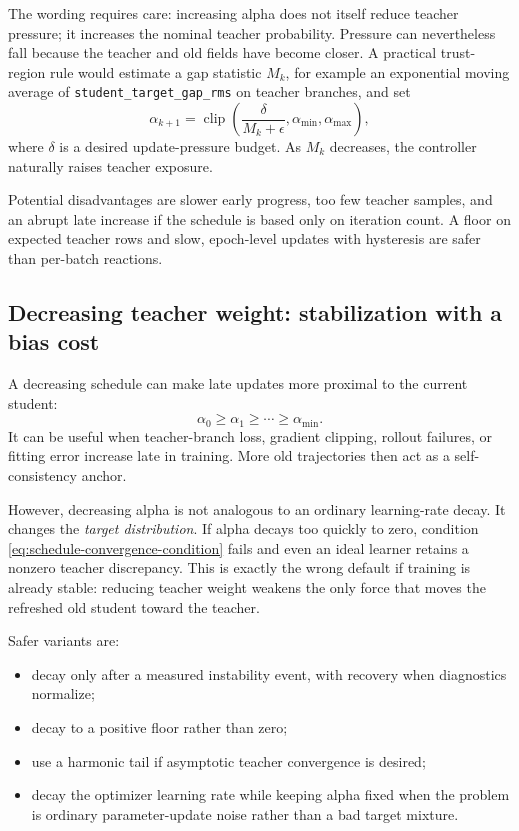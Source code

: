 \documentclass[11pt,a4paper]{article}
\theoremstyle{plain}
\theoremstyle{definition}
\begin{document}
The wording requires care: increasing alpha does not itself reduce teacher pressure; it increases
the nominal teacher probability.  Pressure can nevertheless fall because the teacher and old
fields have become closer.  A practical trust-region rule would estimate a gap statistic $M_k$,
for example an exponential moving average of
\texttt{student\_target\_gap\_rms} on teacher branches, and set
\begin{equation}
\alpha_{k+1}
=
\operatorname{clip}\left(
  \frac{\delta}{M_k+\epsilon},
  \alpha_{\min},
  \alpha_{\max}
\right),
\label{eq:gap-adaptive-alpha}
\end{equation}
where $\delta$ is a desired update-pressure budget.  As $M_k$ decreases, the controller naturally
raises teacher exposure.

Potential disadvantages are slower early progress, too few teacher samples, and an abrupt late
increase if the schedule is based only on iteration count.  A floor on expected teacher rows and
slow, epoch-level updates with hysteresis are safer than per-batch reactions.

\subsection{Decreasing teacher weight: stabilization with a bias cost}

A decreasing schedule can make late updates more proximal to the current student:
\begin{equation}
\alpha_0\ge\alpha_1\ge\cdots\ge\alpha_{\min}.
\end{equation}
It can be useful when teacher-branch loss, gradient clipping, rollout failures, or fitting error
increase late in training.  More old trajectories then act as a self-consistency anchor.

However, decreasing alpha is not analogous to an ordinary learning-rate decay.  It changes the
\emph{target distribution}.  If alpha decays too quickly to zero, condition
\eqref{eq:schedule-convergence-condition} fails and even an ideal learner retains a nonzero
teacher discrepancy.  This is exactly the wrong default if training is already stable: reducing
teacher weight weakens the only force that moves the refreshed old student toward the teacher.

Safer variants are:
\begin{itemize}[leftmargin=1.5em]
\item decay only after a measured instability event, with recovery when diagnostics normalize;
\item decay to a positive floor rather than zero;
\item use a harmonic tail if asymptotic teacher convergence is desired;
\item decay the optimizer learning rate while keeping alpha fixed when the problem is ordinary
      parameter-update noise rather than a bad target mixture.
\end{itemize}
\end{document}
